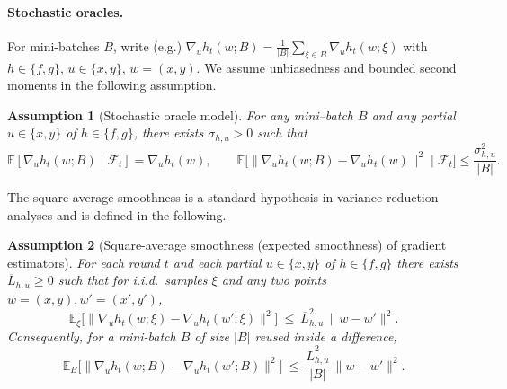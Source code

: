 \documentclass{uai2026} %
\newtheorem{assumption}{Assumption}
\newcommand{\EE}{\mathbb{E}}
\newcommand{\F}{\mathcal{F}}
\begin{document}
\paragraph{Stochastic oracles.}
For mini-batches $B$, write (e.g.) $\nabla_u h_t(w;B)=\tfrac1{|B|}\sum_{\xi\in B}\nabla_u h_t(w;\xi)$ with
$h\in\{f,g\}$, $u\in\{x,y\}$, $w=(x,y)$.
We assume unbiasedness and bounded second moments in the following assumption.
\begin{assumption}[Stochastic oracle model]\label{ass:oracle}
For any mini–batch $B$ and any partial $u\in\{x,y\}$ of $h\in\{f,g\}$, there exists $\sigma_{h,u}>0$ such that
\[
\EE[\nabla_u h_t(w;B)\mid\F_t]=\nabla_u h_t(w),\qquad 
\EE\big[\|\nabla_u h_t(w;B)-\nabla_u h_t(w)\|^2\mid\F_t\big]\le \frac{\sigma^2_{h,u}}{|B|}.
\]

\end{assumption}
The square-average smoothness is a standard hypothesis in variance-reduction analyses \citep{fang2018spider,cutkosky2019momentum} and is defined in the following.
\begin{assumption}[Square-average smoothness (expected smoothness) of gradient estimators]\label{ass:ES}
For each round $t$ and each partial $u\in\{x,y\}$ of $h\in\{f,g\}$ there exists
$\overline L_{h,u}\ge0$ such that for i.i.d.\ samples $\xi$ and any two points $w=(x,y),w'=(x',y')$,
\[
\EE_\xi\big[\|\nabla_u h_t(w;\xi)-\nabla_u h_t(w';\xi)\|^2\big]
~\le~ \overline L_{h,u}^2\,\|w-w'\|^2.
\]
Consequently, for a mini-batch $B$ of size $|B|$ reused inside a difference,
\[
\EE_B\big[\|\nabla_u h_t(w;B)-\nabla_u h_t(w';B)\|^2\big]
~\le~ \frac{\overline L_{h,u}^2}{|B|}\,\|w-w'\|^2 .
\]
\end{assumption}
\end{document}
